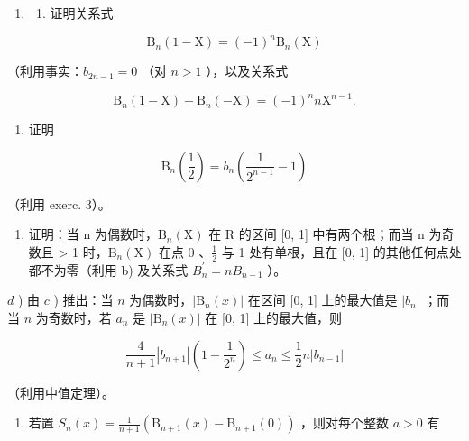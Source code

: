 \begin{enumerate}
\def\labelenumi{\arabic{enumi})}
\setcounter{enumi}{3}
\tightlist
\item
  \begin{enumerate}
  \def\labelenumii{\alph{enumii})}
  \tightlist
  \item
    证明关系式
  \end{enumerate}
\end{enumerate}

\[
\mathrm{B} _ {n} (1 - \mathrm{X}) = (- 1) ^ {n} \mathrm{B} _ {n} (\mathrm{X})
\]

（利用事实：\(b_{2n - 1} = 0\) （对 \(n > 1\) ），以及关系式

\[
\mathrm{B} _ {n} (1 - \mathrm{X}) - \mathrm{B} _ {n} (- \mathrm{X}) = (- 1) ^ {n} n \mathrm{X} ^ {n - 1}.
\]

\begin{enumerate}
\def\labelenumi{\alph{enumi})}
\setcounter{enumi}{1}
\tightlist
\item
  证明
\end{enumerate}

\[
\mathrm{B} _ {n} \left(\frac {1}{2}\right) = b _ {n} \left(\frac {1}{2 ^ {n - 1}} - 1\right)
\]

（利用 exerc. 3）。

\begin{enumerate}
\def\labelenumi{\alph{enumi})}
\setcounter{enumi}{2}
\tightlist
\item
  证明：当 n 为偶数时，\(\mathrm{B}_{n}(\mathrm{X})\) 在 R 的区间 {[}0, 1{]} 中有两个根；而当 n 为奇数且 \textgreater{} 1 时，\(\mathrm{B}_{n}(\mathrm{X})\) 在点 0 、\(\frac{1}{2}\) 与 1 处有单根，且在 {[}0, 1{]} 的其他任何点处都不为零（利用 b) 及关系式 \(B_{n}^{\prime}=nB_{n-1}\) ）。
\end{enumerate}

\(d\) ) 由 \(c\) ) 推出：当 \(n\) 为偶数时，\(|\mathrm{B}_n(x)|\) 在区间 {[}0, 1{]} 上的最大值是 \(|b_n|\) ；而当 \(n\) 为奇数时，若 \(a_{n}\) 是 \(|\mathrm{B}_n(x)|\) 在 {[}0, 1{]} 上的最大值，则

\[
\frac {4}{n + 1} \left| b _ {n + 1} \right| \left(1 - \frac {1}{2 ^ {n}}\right) \leqslant a _ {n} \leqslant \frac {1}{2} n \left| b _ {n - 1} \right|
\]

（利用中值定理）。

\begin{enumerate}
\def\labelenumi{\arabic{enumi})}
\setcounter{enumi}{4}
\tightlist
\item
  若置 \(S_{n}(x) = \frac{1}{n + 1} (\mathrm{B}_{n + 1}(x) - \mathrm{B}_{n + 1}(0))\) ，则对每个整数 \(a > 0\) 有
\end{enumerate}

